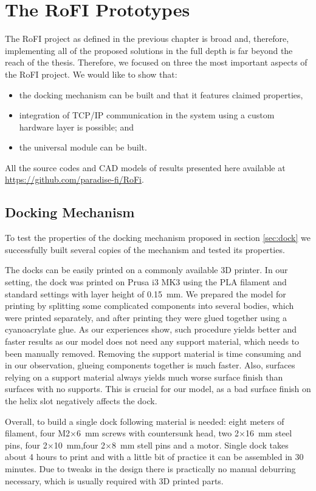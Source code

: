 \chapter{The RoFI Prototypes}\label{chap:prototypes}

The RoFI project as defined in the previous chapter is broad and, therefore,
implementing all of the proposed solutions in the full depth is far beyond the
reach of the thesis. Therefore, we focused on three the most important aspects
of the RoFI project. We would like to show that:
\begin{itemize}
    \item the docking mechanism can be built and that it features claimed
    properties,
    \item integration of TCP/IP communication in the system using a custom
    hardware layer is possible; and
    \item the universal module can be built.
\end{itemize}
All the source codes and CAD models of results presented here available at
\url{https://github.com/paradise-fi/RoFi}.

\section{Docking Mechanism}

To test the properties of the docking mechanism proposed in section
\ref{sec:dock} we successfully built several copies of the mechanism and tested
its properties.

The docks can be easily printed on a commonly available 3D printer. In our
setting, the dock was printed on Prusa i3 MK3 using the PLA filament and
standard settings with layer height of 0.15~mm. We prepared the model for
printing by splitting some complicated components into several bodies, which
were printed separately, and after printing they were glued together using a
cyanoacrylate glue. As our experiences show, such procedure yields better and
faster results as our model does not need any support material, which needs to
been manually removed. Removing the support material is time consuming and in
our observation, glueing components together is much faster. Also, surfaces
relying on a support material always yields much worse surface finish than
surfaces with no supports. This is crucial for our model, as a bad surface
finish on the helix slot negatively affects the dock.

Overall, to build a single dock following material is needed: eight meters of
filament, four M2$\times$6~mm screws with countersunk head, two 2$\times$16~mm
steel pins, four 2$\times$10~mm,four 2$\times$8~mm stell pins and a motor.
Single dock takes about 4 hours to print and with a little bit of practice it
can be assembled in 30 minutes. Due to tweaks in the design there is practically
no manual deburring necessary, which is usually required with 3D printed parts.

